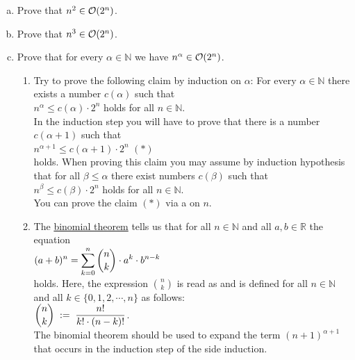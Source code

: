 \exercise
\begin{enumerate}[(a)]
\item Prove that $n^2 \in \mathcal{O}(2^n)$. 
\item Prove that $n^3 \in \mathcal{O}(2^n)$. 
\item Prove that for every $\alpha \in \mathbb{N}$ we have  $n^\alpha \in \mathcal{O}(2^n)$. 
      
      \hint
      \begin{enumerate}[1.]
      \item Try to prove the following claim by induction on $\alpha$:  For every $\alpha \in \mathbb{N}$
            there exists a number $c(\alpha)$ such that
            \\[0.2cm]
            \hspace*{1.3cm}
            $n^\alpha \leq c(\alpha) \cdot 2^n$ \quad holds for all $n \in \mathbb{N}$.
            \\[0.2cm]
            In the induction step you will have to prove that there is a number $c(\alpha+1)$ such that
            \\[0.2cm]
            \hspace*{1.3cm}
            $n^{\alpha+1} \leq c(\alpha+1) \cdot 2^n$ \hspace*{\fill} $(*)$
            \\[0.2cm]
            holds.  When proving this claim you may assume by induction hypothesis that for all 
            $\beta \leq \alpha$ there exist numbers $c(\beta)$ such that
            \\[0.2cm]
            \hspace*{1.3cm}
            $n^{\beta} \leq c(\beta) \cdot 2^n$ \quad holds for all $n \in \mathbb{N}$.
            \\[0.2cm]
            You can prove the claim $(*)$ via a  on $n$.
      \item The \href{https://en.wikipedia.org/wiki/Binomial_theorem}{binomial theorem}
            tells
            us that for all $n \in \mathbb{N}$ and all $a,b \in \mathbb{R}$ the equation
            \\[0.2cm]
            \hspace*{1.3cm}
            $\displaystyle (a+b)^n = \sum\limits_{k=0}^n {n \choose k} \cdot a^k \cdot b^{n-k}$
            \\[0.2cm]
            holds.  Here, the expression ${n \choose k}$ is read as  and is
            defined for all $n \in \mathbb{N}$ and all $k \in \{0, 1, 2, \cdots, n\}$ as follows:
            \\[0.2cm]
            \hspace*{1.3cm}
            $\displaystyle {n \choose k} \;:=\; \frac{n!}{k! \cdot (n-k)!}$.
            \\[0.2cm]
            The binomial theorem should be used to expand the term $(n+1)^{\alpha + 1}$ that occurs
            in the induction step of the side induction.  \eox
      \end{enumerate}
\end{enumerate}

